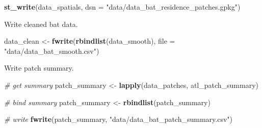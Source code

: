 \documentclass[]{scrartcl}
\newenvironment{Shaded}{}{}
\newcommand{\CommentTok}[1]{\textcolor[rgb]{0.38,0.63,0.69}{\textit{#1}}}
\newcommand{\DataTypeTok}[1]{\textcolor[rgb]{0.56,0.13,0.00}{#1}}
\newcommand{\KeywordTok}[1]{\textcolor[rgb]{0.00,0.44,0.13}{\textbf{#1}}}
\newcommand{\NormalTok}[1]{#1}
\newcommand{\StringTok}[1]{\textcolor[rgb]{0.25,0.44,0.63}{#1}}
\begin{document}
\begin{Shaded}
\begin{Highlighting}[]
\KeywordTok{st_write}\NormalTok{(data_spatials,}
         \DataTypeTok{dsn =} \StringTok{"data/data_bat_residence_patches.gpkg"}\NormalTok{)}
\end{Highlighting}
\end{Shaded}

Write cleaned bat data.

\begin{Shaded}
\begin{Highlighting}[]
\NormalTok{data_clean <-}\StringTok{ }\KeywordTok{fwrite}\NormalTok{(}\KeywordTok{rbindlist}\NormalTok{(data_smooth),}
                     \DataTypeTok{file =} \StringTok{"data/data_bat_smooth.csv"}\NormalTok{)}
\end{Highlighting}
\end{Shaded}

Write patch summary.

\begin{Shaded}
\begin{Highlighting}[]
\CommentTok{# get summary}
\NormalTok{patch_summary <-}\StringTok{ }\KeywordTok{lapply}\NormalTok{(data_patches, atl_patch_summary)}

\CommentTok{# bind summary}
\NormalTok{patch_summary <-}\StringTok{ }\KeywordTok{rbindlist}\NormalTok{(patch_summary)}

\CommentTok{# write}
\KeywordTok{fwrite}\NormalTok{(patch_summary,}
       \StringTok{"data/data_bat_patch_summary.csv"}\NormalTok{)}
\end{Highlighting}
\end{Shaded}
\end{document}

